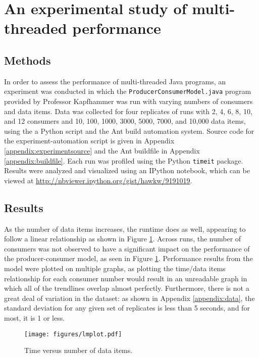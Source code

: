\documentclass[12pt,a4paper]{article}
\begin{document}
 	\section{An experimental study of multi-threaded performance}
 		\subsection{Methods}

	 		In order to assess the performance of multi-threaded Java programs, an experiment was conducted in which the \texttt{ProducerConsumerModel.java} program provided by Professor Kapfhammer was run with varying numbers of consumers and data items. Data was collected for four replicates of runs with 2, 4, 6, 8, 10, and 12 consumers and 10, 100, 1000, 3000, 5000, 7000, and 10,000 data items, using the a Python script and the Ant build automation system. Source code for the experiment-automation script is given in Appendix \ref{appendix:experimentsource} and the Ant buildfile in Appendix \ref{appendix:buildfile}.  Each run was profiled using the Python \texttt{timeit} package. Results were analyzed and visualized using an IPython notebook, which can be viewed at \url{http://nbviewer.ipython.org/gist/hawkw/9191019}.

 		\subsection{Results}

	 		As the number of data items increases, the runtime does as well, appearing to follow a linear relationship as shown in Figure \ref{fig:time/data}. Across runs, the number of consumers was not observed to have a significant impact on the performance of the producer-consumer model, as seen in Figure \ref{fig:time/data}. Performance results from the model were plotted on multiple graphs, as plotting the time/data items relationship for each consumer number would result in an unreadable graph in which all of the trendlines overlap almost perfectly. Furthermore, there is not a great deal of variation in the dataset: as shown in Appendix \ref{appendix:data}, the standard deviation for any given set of replicates is less than 5 seconds, and for most, it is 1 or less.
				
				\begin{figure}[H]
					\centerline{\texttt{[image: figures/lmplot.pdf]}}
					\caption{Time versus number of data items.}
					\label{fig:time/data}
				\end{figure}
\end{document}
